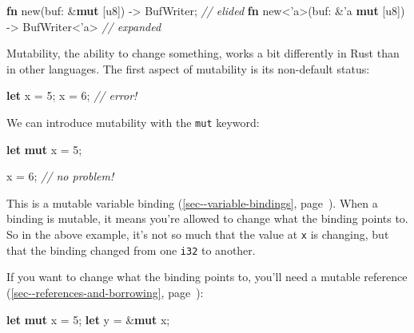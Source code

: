 \documentclass[a4paper,]{book}
\renewcommand*{\hyperref}[2][\ar]{%
  \def\ar{#2}%
  #2 (\autoref{#1}, page~\pageref{#1})}
\newenvironment{Shaded}{\begin{snugshade}}{\end{snugshade}}
\newcommand{\KeywordTok}[1]{\textcolor[rgb]{0.13,0.29,0.53}{\textbf{{#1}}}}
\newcommand{\DataTypeTok}[1]{\textcolor[rgb]{0.13,0.29,0.53}{{#1}}}
\newcommand{\DecValTok}[1]{\textcolor[rgb]{0.00,0.00,0.81}{{#1}}}
\newcommand{\CommentTok}[1]{\textcolor[rgb]{0.56,0.35,0.01}{\textit{{#1}}}}
\newcommand{\OtherTok}[1]{\textcolor[rgb]{0.56,0.35,0.01}{{#1}}}
\newcommand{\NormalTok}[1]{{#1}}
\begin{document}
\begin{Shaded}
\begin{Highlighting}[]
\KeywordTok{fn} \NormalTok{new(buf: &}\KeywordTok{mut} \NormalTok{[}\DataTypeTok{u8}\NormalTok{]) -> BufWriter; }\CommentTok{// elided}
\KeywordTok{fn} \NormalTok{new<}\OtherTok{'a}\NormalTok{>(buf: &}\OtherTok{'a} \KeywordTok{mut} \NormalTok{[}\DataTypeTok{u8}\NormalTok{]) -> BufWriter<}\OtherTok{'a}\NormalTok{> }\CommentTok{// expanded}
\end{Highlighting}
\end{Shaded}


Mutability, the ability to change something, works a bit differently in
Rust than in other languages. The first aspect of mutability is its
non-default status:

\begin{Shaded}
\begin{Highlighting}[]
\KeywordTok{let} \NormalTok{x = }\DecValTok{5}\NormalTok{;}
\NormalTok{x = }\DecValTok{6}\NormalTok{; }\CommentTok{// error!}
\end{Highlighting}
\end{Shaded}

We can introduce mutability with the \texttt{mut} keyword:

\begin{Shaded}
\begin{Highlighting}[]
\KeywordTok{let} \KeywordTok{mut} \NormalTok{x = }\DecValTok{5}\NormalTok{;}

\NormalTok{x = }\DecValTok{6}\NormalTok{; }\CommentTok{// no problem!}
\end{Highlighting}
\end{Shaded}

This is a mutable \hyperref[sec--variable-bindings]{variable binding}.
When a binding is mutable, it means you're allowed to change what the
binding points to. So in the above example, it's not so much that the
value at \texttt{x} is changing, but that the binding changed from one
\texttt{i32} to another.

If you want to change what the binding points to, you'll need a
\hyperref[sec--references-and-borrowing]{mutable reference}:

\begin{Shaded}
\begin{Highlighting}[]
\KeywordTok{let} \KeywordTok{mut} \NormalTok{x = }\DecValTok{5}\NormalTok{;}
\KeywordTok{let} \NormalTok{y = &}\KeywordTok{mut} \NormalTok{x;}
\end{Highlighting}
\end{Shaded}
\end{document}
